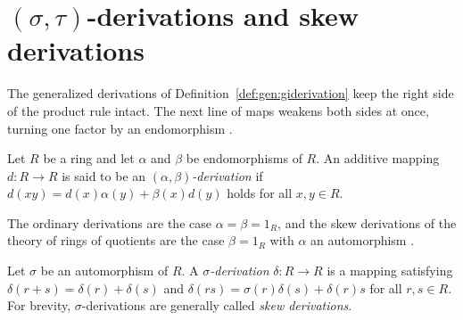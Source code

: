 \section{$(\sigma,\tau)$-derivations and skew derivations}\label{sec:generalized-twisted:sigma-tau}

The generalized derivations of Definition~\ref{def:gen:giderivation} keep
the right side of the product rule intact. The next line of maps weakens
both sides at once, turning one factor by an endomorphism
\cite[p.~892]{Huang2018}.

\begin{definition}\label{def:gen:alphabeta}
Let $R$ be a ring and let $\alpha$ and $\beta$ be endomorphisms of $R$. An
additive mapping $d\colon R\to R$ is said to be an
\emph{$(\alpha,\beta)$-derivation} if $d(xy)=d(x)\alpha(y)+\beta(x)d(y)$
holds for all $x,y\in R$.
\end{definition}

The ordinary derivations are the case $\alpha=\beta=1_{R}$, and the skew
derivations of the theory of rings of quotients are the case $\beta=1_{R}$
with $\alpha$ an automorphism \cite[p.~260]{ChouLiu2009}.

\begin{definition}\label{def:gen:sigma}
Let $\sigma$ be an automorphism of $R$. A \emph{$\sigma$-derivation}
$\delta\colon R\to R$ is a mapping satisfying $\delta(r+s)=\delta(r)+\delta(s)$
and $\delta(rs)=\sigma(r)\delta(s)+\delta(r)s$ for all $r,s\in R$. For
brevity, $\sigma$-derivations are generally called \emph{skew derivations}.
\end{definition}

